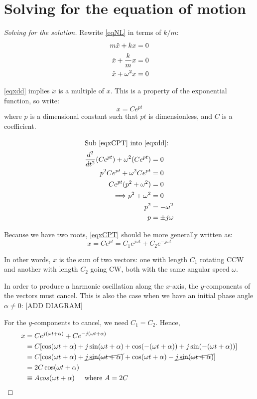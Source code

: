 \documentclass[11pt,letterpaper,titlepage,oneside]{book}
\begin{document}
\section{Solving for the equation of motion}

\begin{proof}[Solving for the solution]
Rewrite \eqref{eqNL} in terms of $k/m$:
\begin{align}
m\ddot{x} + kx &= 0 \notag\\
\ddot{x} + \frac{k}{m}x &= 0 \notag\\
\ddot{x} + \omega^2x  &= 0 \label{eqxdd}
\end{align}

\eqref{eqxdd} implies $\ddot{x}$ is a multiple of $x$. This is a property of the exponential function, so write: 
\begin{equation}
	x=Ce^{pt} \label{eqxCPT}
\end{equation}
where $p$ is a dimensional constant such that $pt$ is dimensionless, and $C$ is a coefficient.

\begin{align*}
\intertext{Sub \eqref{eqxCPT} into \eqref{eqxdd}:}
\frac{d^2}{dt^2}(Ce^{pt})+\omega^2(Ce^{pt}) &= 0\\
p^2Ce^{pt}+\omega^2Ce^{pt}&=0 \\
Ce^{pt}(p^2+\omega^2) &=0 \\
\Longrightarrow p^2 + \omega^2 &= 0 \\
p^2 &= -\omega^2 \\
p &= \pm j\omega
\end{align*}

Because we have two roots, \eqref{eqxCPT} should be more generally written as:
\[ x = Ce^{pt}= C_1e^{j\omega t}+C_2e^{-j\omega t} \]

In other words, $x$ is the sum of two vectors: one with length $C_1$ rotating CCW and another with length $C_2$ going CW, both with the same angular speed $\omega$.

In order to produce a harmonic oscillation along the $x$-axis, the $y$-components of the vectors must cancel. This is also the case when we have an initial phase angle $\alpha\neq 0$:  [ADD DIAGRAM]

For the $y$-components to cancel, we need $C_1=C_2$. Hence,
\begin{align*}
x
&=Ce^{j(\omega t +\alpha)} + Ce^{-j(\omega t +\alpha)} \\
&=C[\cos(\omega t + \alpha) + j\sin(\omega t + \alpha) + \cos(-(\omega t + \alpha)) + j\sin(-(\omega t + \alpha))] \\
&=C[\cos(\omega t + \alpha) + \cancel{j\sin(\omega t + \alpha)} + \cos(\omega t + \alpha) - \cancel{j\sin(\omega t + \alpha)}] \\
&= 2C\cos(\omega t + \alpha) \\
&\equiv Acos(\omega t + \alpha) \hspace{0.5cm}\text{where }A=2C
\end{align*}


\end{proof}
\end{document}
